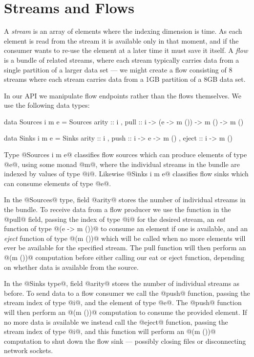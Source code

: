
\clearpage
\section{Streams and Flows}

A \emph{stream} is an array of elements where the indexing dimension is time. As each element is read from the stream it is available only in that moment, and if the consumer wants to re-use the element at a later time it must save it itself. A \emph{flow} is a bundle of related streams, where each stream typically carries data from a single partition of a larger data set --- we might create a flow consisting of 8 streams where each stream carries data from a 1GB partition of a 8GB data set.

In our API we manipulate flow endpoints rather than the flows themselves. We use the following data types:

\begin{code}
data Sources i m e 
   = Sources
   { arity :: i
   , pull  :: i -> (e -> m ()) -> m () -> m () }

data Sinks   i m e 
   = Sinks   
   { arity :: i
   , push  :: i -> e -> m ()
   , eject :: i -> m () }
\end{code}

Type @Sources i m e@ classifies flow sources which can produce elements of type @e@, using some monad @m@, where the individual streams in the bundle are indexed by values of type @i@. Likewise @Sinks i m e@ classifies flow sinks which can consume elements of type @e@.

In the @Sources@ type, field @arity@ stores the number of individual streams in the bundle. To receive data from a flow producer we use the function in the @pull@ field, passing the index of type @i@ for the desired stream, an \emph{eat} function of type @(e -> m ())@ to consume an element if one is available, and an \emph{eject} function of type @(m ())@ which will be called when no more elements will ever be available for the specified stream. The pull function will then perform an @(m ())@ computation before either calling our eat or eject function, depending on whether data is available from the source.

In the @Sinks type@, field @arity@ stores the number of individual streams as before. To send data to a flow consumer we call the @push@ function, passing the stream index of type @i@, and the element of type @e@. The @push@ function will then perform an @(m ())@ computation to consume the provided element. If no more data is available we instead call the @eject@ function, passing the stream index of type @i@, and this function will perform an @(m ())@ computation to shut down the flow sink --- possibly closing files or disconnecting network sockets.

